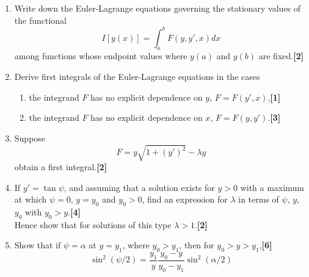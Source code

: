 \documentclass[a4paper]{article}
\begin{document}
\begin{qns}\leavevmode
\begin{enumerate}[label=(\roman*)]
\item Write down the Euler-Lagrange equations governing the stationary values of the functional
$$I[y(x)]=\int_a^bF(y,y',x)dx$$
among functions whose endpoint values where $y(a)$ and $y(b)$ are fixed.\hfill \textbf{[2]}
\item Derive first integrals of the Euler-Lagrange equations in the cases
\begin{enumerate}[label=(\alph*)]
\item the integrand $F$ has no explicit dependence on $y$, $F = F(y', x)$,\hfill \textbf{[1]}
\item the integrand $F$ has no explicit dependence on $x$, $F = F(y, y')$.\hfill \textbf{[3]}
\end{enumerate}
\item Suppose
$$F=y\sqrt{1+(y')^2}-\lambda y$$
obtain a first integral.\hfill \textbf{[2]}
\item If $y'=\tan\psi$, and assuming that a solution exists for $y > 0$ with a maximum at which $\psi=0$, $y=y_0$ and $y_0>0$, find an expression for $\lambda$ in terms of $\psi$, $y$, $y_0$ with $y_0 > y$.\hfill \textbf{[4]}\\[5pt]
Hence show that for solutions of this type $\lambda>1$.\hfill \textbf{[2]}
\item Show that if  $\psi=\alpha$ at $y = y_1$, where $y_0 > y_1$, then for $y_0 > y > y_1$,\hfill \textbf{[6]}
$$\sin^2(\psi/2)=\frac{y_1}{y}\frac{y_0-y}{y_0-y_1}\sin^2(\alpha/2)$$
\end{enumerate}
\end{qns}
\end{document}
